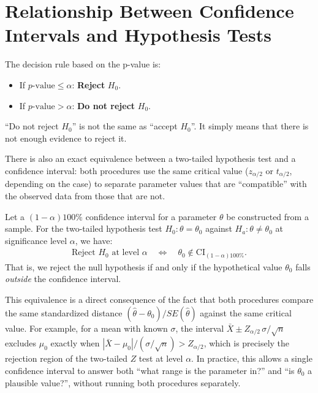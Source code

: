 \section{Relationship Between Confidence Intervals and Hypothesis Tests}
\label{sec:relacion-ic-pruebas}

The decision rule based on the p-value is:

\begin{itemize}
	\item If $p\text{-value} \leq \alpha$: \textbf{Reject} $H_0$.
	\item If $p\text{-value} > \alpha$: \textbf{Do not reject} $H_0$.
\end{itemize}

\begin{observacion}
	``Do not reject $H_0$'' is not the same as ``accept $H_0$''. It simply means that there is not enough evidence to reject it.
\end{observacion}

There is also an exact equivalence between a two-tailed hypothesis test and a confidence interval: both procedures use the same critical value ($z_{\alpha/2}$ or $t_{\alpha/2}$, depending on the case) to separate parameter values that are ``compatible'' with the observed data from those that are not.

\begin{teorema}
	Let a $(1-\alpha)100\%$ confidence interval for a parameter $\theta$ be constructed from a sample. For the two-tailed hypothesis test $H_0: \theta = \theta_0$ against $H_a: \theta \neq \theta_0$ at significance level $\alpha$, we have:
	\begin{align}
		\label{eq:6.2.1}
		\text{Reject } H_0 \text{ at level } \alpha \quad \Longleftrightarrow \quad \theta_0 \notin \text{CI}_{(1-\alpha)100\%}.
	\end{align}
	That is, we reject the null hypothesis if and only if the hypothetical value $\theta_0$ falls \emph{outside} the confidence interval.
\end{teorema}

\begin{observacion}
	This equivalence is a direct consequence of the fact that both procedures compare the same standardized distance $(\hat{\theta}-\theta_0)/SE(\hat{\theta})$ against the same critical value. For example, for a mean with known $\sigma$, the interval $\bar{X} \pm Z_{\alpha/2}\,\sigma/\sqrt{n}$ excludes $\mu_0$ exactly when $|\bar{X}-\mu_0|/(\sigma/\sqrt{n}) > Z_{\alpha/2}$, which is precisely the rejection region of the two-tailed $Z$ test at level $\alpha$. In practice, this allows a single confidence interval to answer both ``what range is the parameter in?'' and ``is $\theta_0$ a plausible value?'', without running both procedures separately.
\end{observacion}
